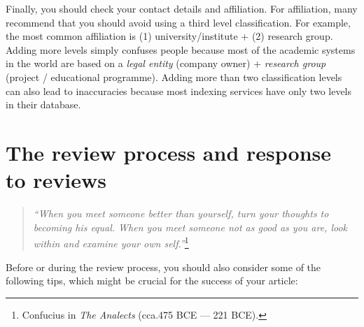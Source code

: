 \documentclass[graybox,envcountchap,sectrefs,UStrade]{svmono}
\begin{document}
Finally, you should check your contact details and affiliation. For affiliation, many recommend that you should avoid using a third level classification. For example, the most common affiliation is (1) university/institute + (2) research group. Adding more levels simply confuses people because most of the academic systems in the world are based on a \emph{legal entity} (company owner) + \emph{research group} (project / educational programme). Adding more than two classification levels can also lead to inaccuracies because most indexing services have only two levels in their database.\par


 \section{The review process and response to reviews}

\begin{quote}
  \emph{``When you meet someone better than yourself, turn your thoughts to becoming his equal. When you meet someone not as good as you are, look within and examine your own self.''}\footnote{Confucius in \emph{The Analects} (cca.\@ 475 BCE --- 221 BCE).}
\end{quote}

Before or during the review process, you should also consider some of the following tips, which might be crucial for the success of your article:
\end{document}
